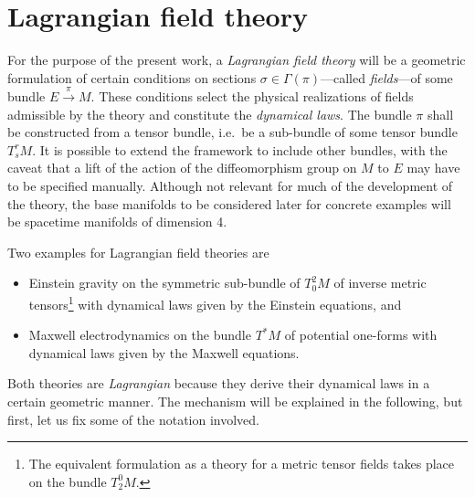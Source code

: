 \section{Lagrangian field theory}
For the purpose of the present work, a \emph{Lagrangian field theory} will be a geometric formulation of certain conditions on sections $\sigma\in\Gamma(\pi)$---called \emph{fields}---of some bundle $E\overset{\pi}{\longrightarrow} M$. These conditions select the physical realizations of fields admissible by the theory and constitute the \emph{dynamical laws}. The bundle $\pi$ shall be constructed from a tensor bundle, i.e.\ be a sub-bundle of some tensor bundle $T^r_sM$. It is possible to extend the framework to include other bundles, with the caveat that a lift of the action of the diffeomorphism group on $M$ to $E$ may have to be specified manually. Although not relevant for much of the development of the theory, the base manifolds to be considered later for concrete examples will be spacetime manifolds of dimension 4.

\begin{example}
  Two examples for Lagrangian field theories are
  \begin{itemize}
    \item Einstein gravity on the symmetric sub-bundle of $T^2_0M$ of inverse metric tensors\footnote{The equivalent formulation as a theory for a metric tensor fields takes place on the bundle $T^0_2M$.} with dynamical laws given by the Einstein equations, and
    \item Maxwell electrodynamics on the bundle $T^\ast M$ of potential one-forms with dynamical laws given by the Maxwell equations.
  \end{itemize}
\end{example}

Both theories are \emph{Lagrangian} because they derive their dynamical laws in a certain geometric manner. The mechanism will be explained in the following, but first, let us fix some of the notation involved.


